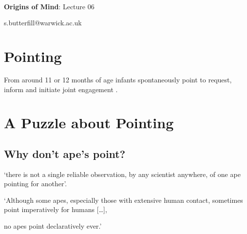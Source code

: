 \documentclass[12pt]{extarticle}
\date{}
\makeatletter
\def \ititle {Origins of Mind}
\def \isubtitle {Lecture 06}
\def \iemail{s.butterfill@warwick.ac.uk}
\makeatother
\begin{document}
\begin{multicols}{3}

\setlength\footnotesep{1em}







\def \ititle {Origins of Mind}
 
\def \isubtitle {Lecture 06}
 
 
 
\
 
 
 
\begin{center}
 
{\Large
 
\textbf{\ititle}: \isubtitle
 
}
 
 
 
\iemail %
 
\end{center}
 
 
 
\section{Pointing}
 
From around 11 or 12 months of age infants spontaneously point to request, inform and initiate joint engagement \citep{Liszkowski:2007mm}.
 
 
 
\section{A Puzzle about Pointing}
 
\subsection{Why don’t ape’s point?}
 
‘there is not a single reliable observation, by any scientist anywhere, of one ape pointing for another’.
\citep[p.\ 507]{Tomasello:2010dy}
 
‘Although some apes, especially those with extensive human contact, sometimes point imperatively for humans […],
 
no apes point declaratively ever.’
\citep[p.\ 510]{Tomasello:2010dy}
 

\end{multicols}
\end{document}
